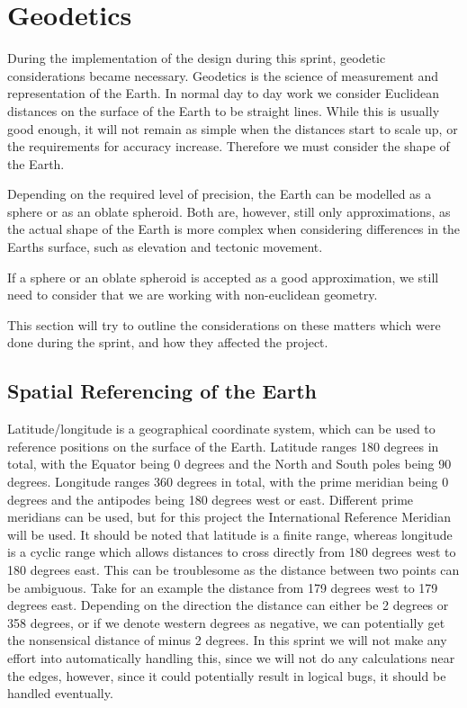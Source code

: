 \section{Geodetics}

During the implementation of the design during this sprint, geodetic considerations became necessary. Geodetics is the science of measurement and representation of the Earth\cite{website:Wikipedia-geodesy}. In normal day to day work we consider Euclidean distances on the surface of the Earth to be straight lines. While this is usually good enough, it will not remain as simple when the distances start to scale up, or the requirements for accuracy increase. Therefore we must consider the shape of the Earth.

Depending on the required level of precision, the Earth can be modelled as a sphere or as an oblate spheroid\cite{}. Both are, however, still only approximations, as the actual shape of the Earth is more complex when considering differences in the Earths surface, such as elevation and tectonic movement.

If a sphere or an oblate spheroid is accepted as a good approximation, we still need to consider that we are working with non-euclidean geometry.

This section will try to outline the considerations on these matters which were done during the sprint, and how they affected the project.

\subsection{Spatial Referencing of the Earth}

Latitude/longitude is a geographical coordinate system, which can be used to reference positions on the surface of the Earth. Latitude ranges 180 degrees in total, with the Equator being 0 degrees and the North and South poles being 90 degrees\cite{}. Longitude ranges 360 degrees in total, with the prime meridian being 0 degrees and the antipodes being 180 degrees west or east\cite{}. Different prime meridians can be used, but for this project the International Reference Meridian will be used\cite{}. It should be noted that latitude is a finite range, whereas longitude is a cyclic range which allows distances to cross directly from 180 degrees west to 180 degrees east. This can be troublesome as the distance between two points can be ambiguous. Take for an example the distance from 179 degrees west to 179 degrees east. Depending on the direction the distance can either be 2 degrees or 358 degrees, or if we denote western degrees as negative, we can potentially get the nonsensical distance of minus 2 degrees. In this sprint we will not make any effort into automatically handling this, since we will not do any calculations near the edges, however, since it could potentially result in logical bugs, it should be handled eventually. 

